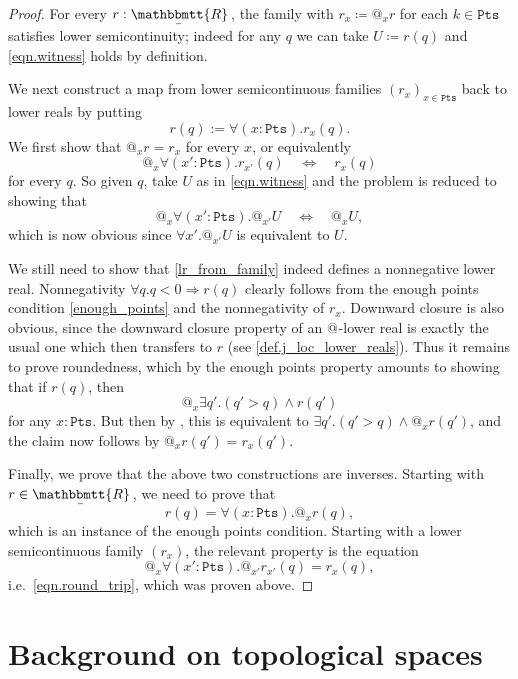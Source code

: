 \documentclass[reqno,11pt]{amsproc}
\makeatletter
\theoremstyle{plain}
\theoremstyle{definition}
\newcommand{\ubar}[1]{\underaccent{\bar}{#1}}
\newcommand{\internal}[1]{\raisebox{-.03ex}{$\mathbbmtt{#1}$}}
\newcommand{\hs}{\hspace{1pt}}
\newcommand{\trr}{\internal{R}}
\newcommand{\tlrr}{\ubar{\trr}\hs}
\newcommand{\pt}{x}
\newcommand{\pts}{\mathtt{Pts}}		%
\newcommand{\atsymbol}{{@}}
\newcommand{\at}[1][\pt]{\atsymbol_{#1}}
\newcommand{\imp}{\Rightarrow}
\numberwithin{equation}{section}
\makeatother
\begin{document}
\begin{proof}
	For every $r : \tlrr$, the family with $r_\pt\coloneqq \at r$ for each $k\in\pts$ satisfies lower semicontinuity; indeed for any $q$ we can take $U\coloneqq r(q)$ and \eqref{eqn.witness} holds by definition.

	We next construct a map from lower semicontinuous families $(r_\pt)_{\pt\in\pts}$ back to lower reals by putting
	\begin{equation}
		\label{lr_from_family}
		r(q) := \forall (\pt : \pts) . r_\pt(q).
	\end{equation}
	We first show that $\at r = r_\pt$ for every $\pt$, or equivalently
	\[
		\at \forall (\pt':\pts) . r_{\pt'}(q) \quad \Longleftrightarrow \quad r_\pt(q)
	\]
	for every $q$. So given $q$, take $U$ as in \eqref{eqn.witness} and the problem is reduced to showing that
	\begin{equation}\label{eqn.round_trip}
		\at \forall (\pt':\pts) . \at[\pt'] U \quad \Longleftrightarrow \quad \at U,
	\end{equation}
	which is now obvious since $\forall \pt' . \at[\pt'] U$ is equivalent to $U$.

	We still need to show that \eqref{lr_from_family} indeed defines a nonnegative lower real. Nonnegativity $\forall q. q<0\imp r(q)$ clearly follows from the enough points condition \cref{enough_points} and the nonnegativity of $r_\pt$. Downward closure is also obvious, since the downward closure property of an $\at[]$-lower real is exactly the usual one which then transfers to $r$ (see \cref{def.j_loc_lower_reals}). Thus it remains to prove roundedness, which by the enough points property amounts to showing that if $r(q)$, then 
	\[
		\at \exists q'. (q' > q) \wedge r(q')
	\]
	for any $\pt : \pts$. But then by , this is equivalent to $\exists q'. (q' > q)\wedge \at r(q')$, and the claim now follows by $\at r(q') = r_\pt(q')$.

	Finally, we prove that the above two constructions are inverses. Starting with $r \in \tlrr$, we need to prove that
	\[
		r(q) = \forall (\pt : \pts) . \at r(q),
	\]
	which is an instance of the enough points condition. Starting with a lower semicontinuous family $(r_\pt)$, the relevant property is the equation
	\[
		\at \forall (\pt' : \pts) . \at[\pt'] r_{\pt'}(q) = r_\pt(q),
	\]
	i.e.\ \eqref{eqn.round_trip}, which was proven above.
\end{proof}

\section{Background on topological spaces}
\end{document}
